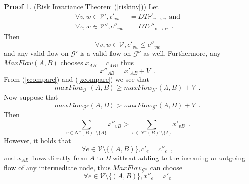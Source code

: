 \documentclass[11pt]{llncs}
\theoremstyle{definition}
\newtheorem{sepproof}{Proof}
\begin{document}
    \begin{sepproof} (Risk Invariance Theorem (\ref{riskinv}))
       Let
       \begin{align*}
          \forall v,w \in \mathcal{V}', c'_{vw} &= DTr'_{v \rightarrow w} \mbox{ and} \\
          \forall v,w \in \mathcal{V}'', c''_{vw} &= DTr''_{v \rightarrow w} \enspace.
       \end{align*}
       Then
       \begin{equation}
       \label{ccompare}
          \forall v, w \in \mathcal{V}, c'_{vw} \leq c''_{vw}
       \end{equation}
       and any valid flow on $\mathcal{G}'$ is a valid flow on $\mathcal{G}''$ as well. Furthermore, any
       $MaxFlow\left(A, B\right)$ chooses $x_{AB} = c_{AB}$, thus
       \begin{equation}
       \label{xcompare}
          x''_{AB} = x'_{AB} + V \enspace.
       \end{equation}
       From (\ref{ccompare}) and (\ref{xcompare}) we see that
       \begin{equation}
       \label{doublebigger}
          maxFlow_{\mathcal{G}''}\left(A, B\right) \geq maxFlow_{\mathcal{G}'}\left(A, B\right) + V \enspace.
       \end{equation}
       Now suppose that
       \begin{equation}
       \label{mfsupposition}
          maxFlow_{\mathcal{G}''}\left(A, B\right) > maxFlow_{\mathcal{G}'}\left(A, B\right) + V \enspace.
       \end{equation}
       Then 
       \begin{equation*}
          \sum\limits_{v \in N^{-}\left(B\right)'' \setminus \{A\}}x''_{vB} > \sum\limits_{v \in N^{-}\left(B\right)'
          \setminus \{A\}}x'_{vB} \enspace.
       \end{equation*}
       However, it holds that
       \begin{equation}
       \label{cequal}
          \forall e \in \mathcal{V} \setminus \{\left(A, B\right)\}, c'_e = c''_e \enspace,
       \end{equation}
       and $x_{AB}$ flows directly from $A$ to $B$ without adding to the incoming or outgoing flow of any intermediate node,
       thus $MaxFlow_{\mathcal{G}''}$ can choose
       \begin{equation*}
          \forall e \in \mathcal{V} \setminus \{\left(A, B\right)\}, x''_e = x'_e
       \end{equation*}

\end{sepproof}
\end{document}
